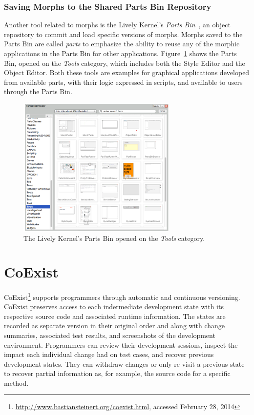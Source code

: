\subsubsection{Saving Morphs to the Shared Parts Bin Repository}

Another tool related to morphs is the Lively Kernel's \emph{Parts Bin}~\cite{Lincke2012LPC}, an object repository to commit and load specific versions of morphs.
Morphs saved to the Parts Bin are called \emph{parts} to emphasize the ability to reuse any of the morphic applications in the Parts Bin for other applications.
Figure~\ref{fig:PartsBin} shows the Parts Bin, opened on the \emph{Tools} category, which includes both the Style Editor and the Object Editor.
Both these tools are examples for graphical applications developed from available parts, with their logic expressed in scripts, and available to users through the Parts Bin.

\begin{figure}[h]
    \centering
    \includegraphics[width=0.7\textwidth]{figures/2_background/3_partsBin.pdf}
    \caption{The Lively Kernel's Parts Bin opened on the \emph{Tools} category.}
    \label{fig:PartsBin}
\end{figure}


\section{CoExist}

CoExist\footnote{\url{http://www.bastiansteinert.org/coexist.html}, accessed February 28, 2014} supports programmers through automatic and continuous versioning.
CoExist preserves access to each indermediate development state with its respective source code and associated runtime information.
The states are recorded as separate version in their original order and along with change summaries, associated test results, and screenshots of the development environment.
Programmers can review their development sessions, inspect the impact each individual change had on test cases, and recover previous development states.
They can withdraw changes or only re-visit a previous state to recover partial information as, for example, the source code for a specific method.

